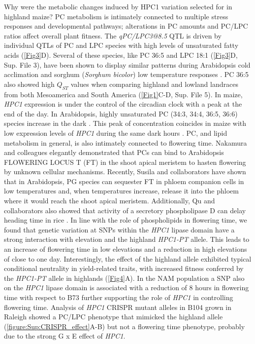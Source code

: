 \documentclass[9pt,twocolumn,twoside,lineno]{biorxiv}
\newcommand{\hpc}{\textit{HPC1}\xspace}
\begin{document}
Why were the metabolic changes induced by HPC1 variation selected for in highland maize?
PC metabolism is intimately connected to multiple stress responses and developmental pathways; alterations in PC amounts and PC/LPC ratios affect overall plant fitness.
The \textit{qPC/LPC3@8.5} QTL is driven by individual QTLs of PC and LPC species with high levels of unsaturated fatty acids (\cref{Fig3}D).
Several of these species, like PC 36:5 and LPC 18:1 (\cref{Fig3}D, Sup. File 3), have been shown to display similar patterns during Arabidopsis cold acclimation \cite{Welti2002-uk} and sorghum (\textit{Sorghum bicolor}) low temperature responses \cite{Marla2017-ph}.
PC 36:5 also showed high $Q_{ST}$ values when comparing highland and lowland landraces from both Mesoamerica and South America (\cref{Fig1}C-D, Sup. File 5).
In maize, \hpc expression is under the control of the circadian clock \cite{Khan2010-iv} with a peak at the end of the day. 
In Arabidopsis, highly unsaturated PC (34:3, 34:4, 36:5, 36:6) species increase in the dark \cite{Maatta2012-ip}. 
This peak of concentration coincides in maize with low expression levels of \hpc during the same dark hours \cite{Khan2010-iv}.
PC, and lipid metabolism in general, is also intimately connected to flowering time. 
Nakamura and colleagues elegantly demonstrated that PCs can bind to Arabidopsis FLOWERING LOCUS T (FT) in the shoot apical meristem to hasten flowering \cite{Nakamura2014-qf, Nakamura2019-ht} by unknown cellular mechanisms. 
Recently, Susila and collaborators have shown that in Arabidopsis, PG species can sequester FT in phloem companion cells in low temperatures \cite{Susila2021-dz} and, when temperatures increase, release it into the phloem where it would reach the shoot apical meristem.   
Additionally, Qu and collaborators also showed that activity of a secretory phospholipase D can delay heading time in rice \cite{Qu2021-wc}.
In line with the role of phospholipids in flowering time, we found that genetic variation at SNPs within the  \hpc lipase domain have a strong interaction with elevation and the highland \textit{HPC1-PT} allele. 
This leads to an increase of flowering time in low elevations and a reduction in high elevations of close to one day. 
Interestingly, the effect of the highland allele exhibited typical conditional neutrality in yield-related traits, with increased fitness conferred by the \textit{HPC1-PT} allele in highlands (\cref{Fig4}A). 
In the NAM population a SNP also on the \hpc lipase domain is associated with a reduction of 8 hours in flowering time with respect to B73 \cite{Wallace2014-yy} further supporting the role of \hpc in controlling flowering time. 
Analysis of \hpc CRISPR mutant alleles in B104 grown in Raleigh showed a PC/LPC phenotype that mimicked the highland allele (\cref{figure:Sup:CRISPR_effect}A-B) but not a flowering time phenotype, probably due to the strong G x E effect of \hpc. 
\end{document}
